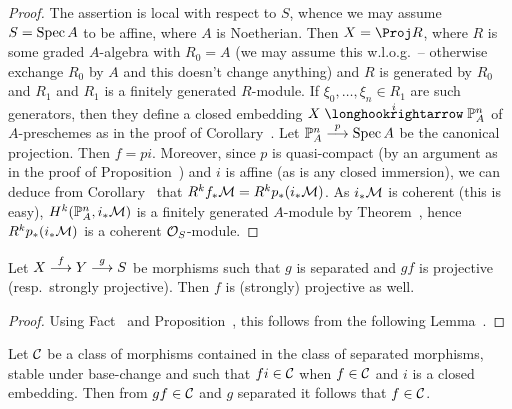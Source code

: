 \documentclass[a4paper,parskip=half,numbers=enddot, DIV=12]{scrreprt}
\begin{document}
\begin{proof}
	The assertion is local with respect to $S$, whence we may assume $S=\operatorname{Spec} A$ to be affine, where $A$ is Noetherian. Then $X=\Proj R$, where $R$ is some graded $A$-algebra with $R_0=A$ (we may assume this w.l.o.g.\ -- otherwise exchange $R_0$ by $A$ and this doesn't change anything) and $R$ is generated by $R_0$ and $R_1$ and $R_1$ is a finitely generated $R$-module. If $\xi_0,\ldots,\xi_n\in R_1$ are such generators, then they define a closed embedding $X\monomorphism[i]\IP_A^n$ of $A$-preschemes as in the proof of Corollary~. Let $\IP_A^n\morphism[p] \Spec A$ be the canonical projection. Then $f=pi$. Moreover, since $p$ is quasi-compact (by an argument as in the proof of Proposition~) and $i$ is affine (as is any closed immersion), we can deduce from Corollary~ that $R^kf_*\mathcal{M}=R^kp_*(i_*\mathcal{M})$. As $i_*\mathcal{M}$ is coherent (this is easy), $H^k(\mathbb{P}_A^n,i_*\mathcal{M})$ is a finitely generated $A$-module by Theorem~, hence $R^kp_*(i_*\mathcal{M})$ is a coherent $\mathcal{O}_S$-module.
\end{proof}
\begin{prop}
	Let $X\morphism[f]Y\morphism[g]S$ be morphisms such that $g$ is separated and $gf$ is projective (resp.\ strongly projective). Then $f$ is (strongly) projective as well.
\end{prop}
\begin{proof}
	Using Fact~ and Proposition~, this follows from the following Lemma~.
\end{proof}
\begin{lem}
	Let $\mathcal{C}$ be a class of morphisms contained in the class of separated morphisms, stable under base-change and such that $fi\in\mathcal{C}$ when $f\in \mathcal{C}$ and $i$ is a closed embedding. Then from $gf\in\mathcal{C}$ and $g$ separated it follows that $f\in \mathcal{C}$.
\end{lem}
\end{document}
